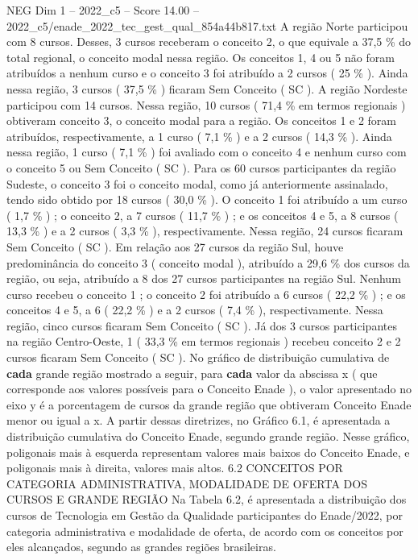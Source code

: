 \begin{textsample}{NEG Dim 1 – 2022\_c5 – Score 14.00 – 2022\_c5/enade\_2022\_tec\_gest\_qual\_854a44b817.txt}
A região Norte participou com 8 cursos.
Desses, 3 cursos receberam o conceito 2, o que equivale a 37,5 \% do total regional, o conceito modal nessa região.
Os conceitos 1, 4 ou 5 não foram atribuídos a nenhum curso e o conceito 3 foi atribuído a 2 cursos ( 25 \% ).
Ainda nessa região, 3 cursos ( 37,5 \% ) ficaram Sem Conceito ( SC ).
A região Nordeste participou com 14 cursos.
Nessa região, 10 cursos ( 71,4 \% em termos regionais ) obtiveram conceito 3, o conceito modal para a região.
Os conceitos 1 e 2 foram atribuídos, respectivamente, a 1 curso ( 7,1 \% ) e a 2 cursos ( 14,3 \% ).
Ainda nessa região, 1 curso ( 7,1 \% ) foi avaliado com o conceito 4 e nenhum curso com o conceito 5 ou Sem Conceito ( SC ).
Para os 60 cursos participantes da região Sudeste, o conceito 3 foi o conceito modal, como já anteriormente assinalado, tendo sido obtido por 18 cursos ( 30,0 \% ).
O conceito 1 foi atribuído a um curso ( 1,7 \% ) ; o conceito 2, a 7 cursos ( 11,7 \% ) ; e os conceitos 4 e 5, a 8 cursos ( 13,3 \% ) e a 2 cursos ( 3,3 \% ), respectivamente.
Nessa região, 24 cursos ficaram Sem Conceito ( SC ).
Em relação aos 27 cursos da região Sul, houve predominância do conceito 3 ( conceito modal ), atribuído a 29,6 \% dos cursos da região, ou seja, atribuído a 8 dos 27 cursos participantes na região Sul.
Nenhum curso recebeu o conceito 1 ; o conceito 2 foi atribuído a 6 cursos ( 22,2 \% ) ; e os conceitos 4 e 5, a 6 ( 22,2 \% ) e a 2 cursos ( 7,4 \% ), respectivamente.
Nessa região, cinco cursos ficaram Sem Conceito ( SC ).
Já dos 3 cursos participantes na região Centro-Oeste, 1 ( 33,3 \% em termos regionais ) recebeu conceito 2 e 2 cursos ficaram Sem Conceito ( SC ).
No gráfico de distribuição cumulativa de \textbf{cada} grande região mostrado a seguir, para \textbf{cada} valor da abscissa x ( que corresponde aos valores possíveis para o Conceito Enade ), o valor apresentado no eixo y é a porcentagem de cursos da grande região que obtiveram Conceito Enade menor ou igual a x.
A partir dessas diretrizes, no Gráfico 6.1, é apresentada a distribuição cumulativa do Conceito Enade, segundo grande região.
Nesse gráfico, poligonais mais à esquerda representam valores mais baixos do Conceito Enade, e poligonais mais à direita, valores mais altos. 6.2 CONCEITOS POR CATEGORIA ADMINISTRATIVA, MODALIDADE DE OFERTA DOS CURSOS E GRANDE REGIÃO Na Tabela 6.2, é apresentada a distribuição dos cursos de Tecnologia em Gestão da Qualidade participantes do Enade/2022, por categoria administrativa e modalidade de oferta, de acordo com os conceitos por eles alcançados, segundo as grandes regiões brasileiras.

\end{textsample}
